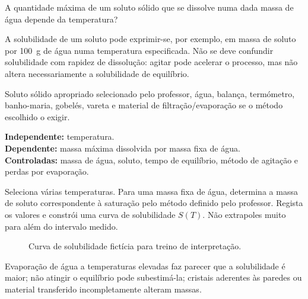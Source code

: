 \documentclass[11pt,a4paper,openany]{book}
\begin{document}
\begin{questao}
A quantidade máxima de um soluto sólido que se dissolve numa dada massa de água depende da temperatura?
\end{questao}

\begin{fundamento}
A solubilidade de um soluto pode exprimir-se, por exemplo, em massa de soluto por \SI{100}{g} de água numa temperatura especificada. Não se deve confundir solubilidade com rapidez de dissolução: agitar pode acelerar o processo, mas não altera necessariamente a solubilidade de equilíbrio.
\end{fundamento}

\begin{material}
Soluto sólido apropriado selecionado pelo professor, água, balança, termómetro, banho-maria, gobelés, vareta e material de filtração/evaporação se o método escolhido o exigir.
\end{material}

\begin{variaveis}
\textbf{Independente:} temperatura.\\
\textbf{Dependente:} massa máxima dissolvida por massa fixa de água.\\
\textbf{Controladas:} massa de água, soluto, tempo de equilíbrio, método de agitação e perdas por evaporação.
\end{variaveis}

\begin{metodo}
Seleciona várias temperaturas. Para uma massa fixa de água, determina a massa de soluto correspondente à saturação pelo método definido pelo professor. Regista os valores e constrói uma curva de solubilidade $S(T)$. Não extrapoles muito para além do intervalo medido.
\end{metodo}

\begin{figure}[H]
\centering
{}
\caption{Curva de solubilidade fictícia para treino de interpretação.}
\end{figure}

\begin{erros}
Evaporação de água a temperaturas elevadas faz parecer que a solubilidade é maior; não atingir o equilíbrio pode subestimá-la; cristais aderentes às paredes ou material transferido incompletamente alteram massas.
\end{erros}
\end{document}
